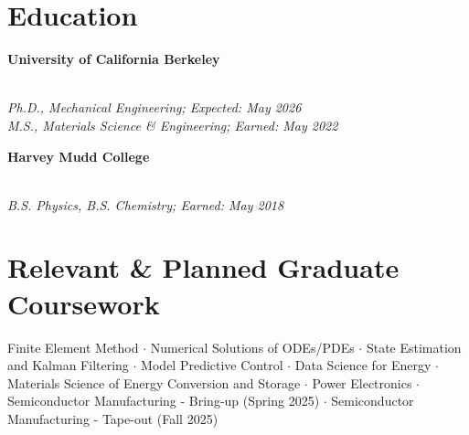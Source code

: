 \documentclass[letterpaper,10.8pt]{article}
\newcommand{\resumeSubHeadingListStart}{\begin{itemize}[leftmargin=*]}
\newcommand{\resumeSubHeadingListEnd}{\end{itemize}}
\begin{document}
\vspace{4pt}
\noindent
\begin{minipage}[t]{0.48\textwidth}
\section{Education}
\resumeSubHeadingListStart

{\vspace{-2pt}\item \textbf{University of California Berkeley}} \\
\textit{\small Ph.D., Mechanical Engineering; Expected: May 2026} \\ 
\textit{\small M.S., Materials Science \& Engineering; Earned: May 2022}  

{\vspace{-2pt}\item \textbf{Harvey Mudd College}} \\
\textit{\small B.S. Physics, B.S. Chemistry; Earned: May 2018} 

\resumeSubHeadingListEnd
\end{minipage}%
\hfill
\begin{minipage}[t]{0.5\textwidth}
\section{Relevant \& Planned Graduate Coursework}
\small{
Finite Element Method $\cdot$
Numerical Solutions of ODEs/PDEs $\cdot$ 
State Estimation and Kalman Filtering  $\cdot$
Model Predictive Control  $\cdot$
Data Science for Energy $\cdot$
Materials Science of Energy Conversion and Storage $\cdot$
Power Electronics $\cdot$
Semiconductor Manufacturing - Bring-up (Spring 2025) $\cdot$
Semiconductor Manufacturing - Tape-out (Fall 2025)}
\end{minipage}
 
\end{document}
